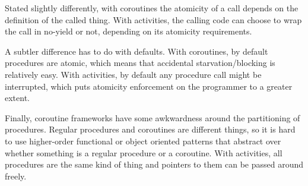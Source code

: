 \documentclass[9pt,preprint]{sigplanconf}
\begin{document}
Stated slightly differently, with coroutines the atomicity of a call depends on the definition of the called thing.
With activities, the calling code can choose to wrap the call in no-yield or not, depending on its atomicity requirements.

A subtler difference has to do with defaults.
With coroutines, by default procedures are atomic, which means that accidental starvation/blocking is relatively easy.
With activities, by default any procedure call might be interrupted, which puts atomicity enforcement on the programmer to a greater extent.

Finally, coroutine frameworks have some awkwardness around the partitioning of procedures.
Regular procedures and coroutines are different things, so it is hard to use higher-order functional or object oriented patterns that abstract over whether something is a regular procedure or a coroutine.
With activities, all procedures are the same kind of thing and pointers to them can be passed around freely.



\end{document}
